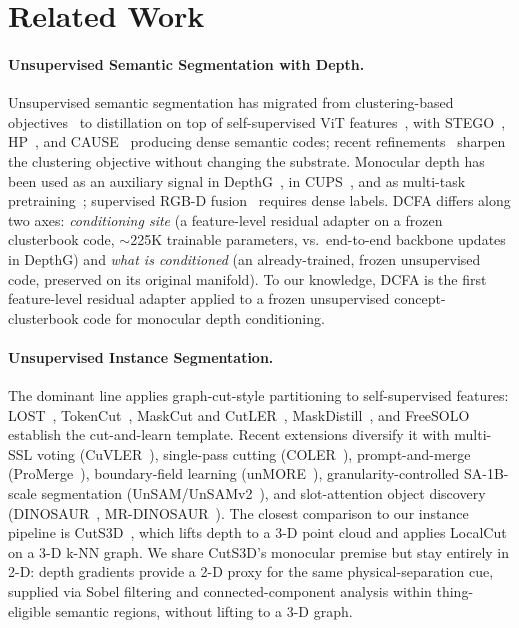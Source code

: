 \documentclass{article}
\begin{document}
\FloatBarrier
\section{Related Work}
\label{sec:related}

\paragraph{Unsupervised Semantic Segmentation with Depth.}
Unsupervised semantic segmentation has migrated from clustering-based objectives~\cite{ji2019iic,cho2021picie} to distillation on top of self-supervised ViT features~\cite{caron2021dino,oquab2024dinov2}, with STEGO~\cite{hamilton2022stego}, HP~\cite{seong2023hp}, and CAUSE~\cite{kim2024cause} producing dense semantic codes; recent refinements~\cite{kim2024eagle,seong2024ppap,couairon2024diffcut,bonnet2024hierarchy} sharpen the clustering objective without changing the substrate. Monocular depth has been used as an auxiliary signal in DepthG~\cite{sick2024depthg}, in CUPS~\cite{hahn2025cups}, and as multi-task pretraining~\cite{hoyer2021threeways}; supervised RGB-D fusion~\cite{yin2025dformerv2} requires dense labels. DCFA differs along two axes: \emph{conditioning site} (a feature-level residual adapter on a frozen clusterbook code, $\sim$225K trainable parameters, vs.\ end-to-end backbone updates in DepthG) and \emph{what is conditioned} (an already-trained, frozen unsupervised code, preserved on its original manifold). To our knowledge, DCFA is the first feature-level residual adapter applied to a frozen unsupervised concept-clusterbook code for monocular depth conditioning.

\paragraph{Unsupervised Instance Segmentation.}
The dominant line applies graph-cut-style partitioning to self-supervised features: LOST~\cite{simeoni2021lost}, TokenCut~\cite{wang2023tokencut}, MaskCut and CutLER~\cite{wang2023cutler}, MaskDistill~\cite{vangansbeke2022maskdistill}, and FreeSOLO~\cite{wang2022freesolo} establish the cut-and-learn template. Recent extensions diversify it with multi-SSL voting (CuVLER~\cite{arica2024cuvler}), single-pass cutting (COLER~\cite{feng2025coler}), prompt-and-merge (ProMerge~\cite{li2024promerge}), boundary-field learning (unMORE~\cite{yang2025unmore}), granularity-controlled SA-1B-scale segmentation (UnSAM/UnSAMv2~\cite{wang2024unsam,yu2025unsamv2}), and slot-attention object discovery (DINOSAUR~\cite{seitzer2023dinosaur}, MR-DINOSAUR~\cite{gong2025mrdinosaur}). The closest comparison to our instance pipeline is CutS3D~\cite{sick2025cuts3d}, which lifts depth to a 3-D point cloud and applies LocalCut on a 3-D k-NN graph. We share CutS3D's monocular premise but stay entirely in 2-D: depth gradients provide a 2-D proxy for the same physical-separation cue, supplied via Sobel filtering and connected-component analysis within thing-eligible semantic regions, without lifting to a 3-D graph.
\end{document}
